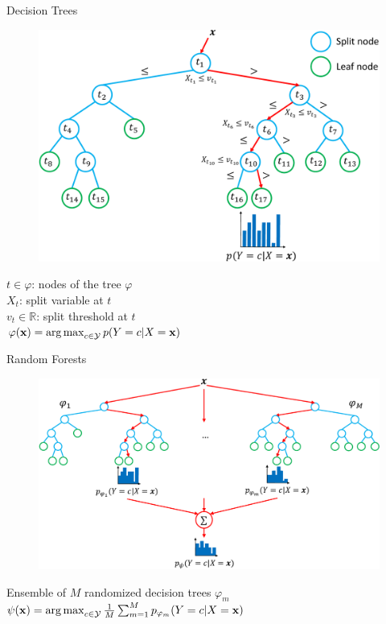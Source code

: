 \documentclass{beamer}
\DeclareMathOperator*{\argmax}{arg\,max}
\begin{document}
\begin{frame}{Decision Trees}

\vspace{-1cm}
\begin{figure}
    \hspace*{0.5cm}\includegraphics[scale=0.5]{./figures/tree.pdf}
\end{figure}

\vspace{-1.75cm}
$t \in \varphi$: nodes of the tree $\varphi$\\
$X_t$: split variable at $t$ \\
$v_t \in \mathbb{R}$: split threshold at $t$\\
$\varphi(\mathbf{x}) = \argmax_{c \in {\cal Y}} p(Y = c | X = \mathbf{x})$

\end{frame}

\begin{frame}{Random Forests}
\begin{figure}
    \includegraphics[scale=0.5]{./figures/forest.pdf}
\end{figure}

Ensemble of $M$ randomized decision trees $\varphi_m$\\
$\psi(\mathbf{x}) = \argmax_{c \in {\cal Y}} \frac{1}{M} \sum_{m=1}^M p_{\varphi_m}(Y = c | X = \mathbf{x})$

\end{frame}
\end{document}
